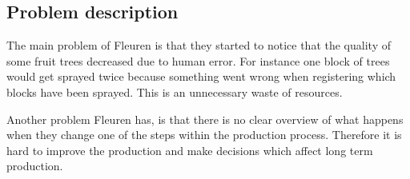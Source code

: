 \subsection{Problem description}
The main problem of Fleuren is that they started to notice that the quality of some fruit trees decreased due to human error. For instance  one block of trees would get sprayed twice because something went wrong when registering which blocks have been sprayed. This is an unnecessary waste of resources.

Another problem Fleuren has, is that there is no clear overview of what happens when they change one of the steps within the production process. Therefore it is hard to improve the production and make decisions which affect long term production.